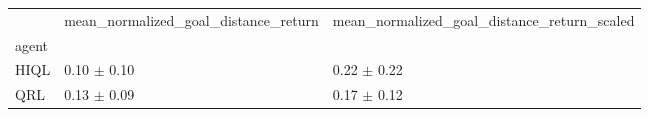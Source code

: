 \begin{tabular}{lll}
\toprule
 & mean_normalized_goal_distance_return & mean_normalized_goal_distance_return_scaled \\
agent &  &  \\
\midrule
HIQL & 0.10 $\pm$ 0.10 & 0.22 $\pm$ 0.22 \\
QRL & 0.13 $\pm$ 0.09 & 0.17 $\pm$ 0.12 \\
\bottomrule
\end{tabular}
